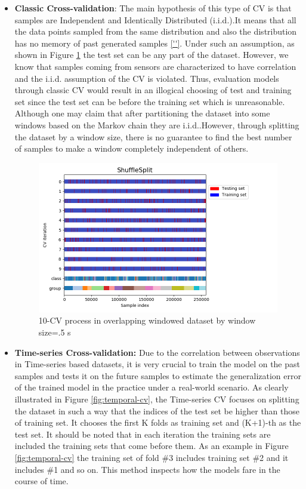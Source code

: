 \begin{itemize}
\item \textbf{Classic Cross-validation}: The main hypothesis of this 
type of CV is that samples are Independent and Identically Distributed 
(i.i.d.).It means that all the data points sampled from the same 
distribution and also the distribution has no memory of past generated 
samples \ref{''}. Under such an assumption, as shown in Figure 
\ref{fig:iid-cv} the test set can be any part of the dataset. However, 
we know that samples coming from sensors are characterized to have 
correlation and the i.i.d. assumption of the CV is violated. Thus, 
evaluation models through classic CV would result in an illogical 
choosing of test and training set since the test set can be before the 
training set which is unreasonable. Although one may claim that after 
partitioning the dataset into some windows based on the Markov chain 
\cite{gilks1995markov} they are i.i.d..However, through splitting the 
dataset by a window size, there is no guarantee to find the best number 
of samples to make a window completely independent of others. 

\begin{figure}[h]
    \centering
    \includegraphics[width=.5\textwidth]{Figures/ShuffleSplit.png}
    \caption{10-CV process in overlapping windowed dataset by window size=.5 s }
    \label{fig:iid-cv}
\end{figure}


\item \textbf{Time-series Cross-validation:}
Due to the correlation between observations in Time-series based datasets, it is very crucial to train the model on the past samples and tests it on the future samples to estimate the generalization error of the trained model in the practice under a real-world scenario. As clearly illustrated in Figure \ref{fig:temporal-cv}, the Time-series CV focuses on splitting the dataset in such a way that the indices of the test set be higher than those of training set. It chooses the first K folds as training set and (K+1)-th as the test set. It should be noted that in each iteration the training sets are included the training sets that come before them. As an example in Figure \ref{fig:temporal-cv} the training set of fold \#3 includes training set \#2 and it includes \#1 and so on.
This method inspects how the models fare in the course of time.



\end{itemize}
